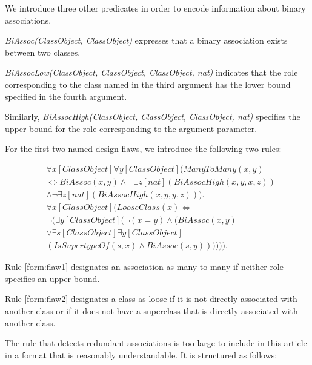 \documentclass[conference]{IEEEtran}
\begin{document}
We introduce three other predicates in order to encode information about binary associations.

\textit{BiAssoc(ClassObject, ClassObject)} expresses that a binary association exists between two classes.

\textit{BiAssocLow(ClassObject, ClassObject, ClassObject, nat)} indicates that the role corresponding to the class named in the third argument has the lower bound specified in the fourth argument.

Similarly, \textit{BiAssocHigh(ClassObject, ClassObject, ClassObject, nat)} specifies the upper bound for the role corresponding to the argument parameter.

For the first two named design flaws, we introduce the following two rules:

\begin{align}
	\nonumber &\forall{x}[ClassObject]\forall{y}[ClassObject](ManyToMany(x, y) \\ \nonumber &\Leftrightarrow BiAssoc(x, y) \land \lnot \exists{z}[nat](BiAssocHigh(x, y, x, z)) \\ &\land \lnot \exists{z}[nat](BiAssocHigh(x, y, y, z))).\label{form:flaw1} \\
	\nonumber &\forall{x}[ClassObject](LooseClass(x) \Leftrightarrow \\ \nonumber &\lnot (\exists{y}[ClassObject](\lnot(x = y) \land (BiAssoc(x, y) \\ \nonumber  &\lor \exists{s}[ClassObject]\exists{y}[ClassObject]\\ &(IsSupertypeOf(s, x) \land BiAssoc(s, y)))))).\label{form:flaw2}
\end{align}

Rule \ref{form:flaw1} designates an association as many-to-many if neither role specifies an upper bound.

Rule \ref{form:flaw2} designates a class as loose if it is not directly associated with another class or if it does not have a superclass that is directly associated with another class.

The rule that detects redundant associations is too large to include in this article in a format that is reasonably understandable. It is structured as follows:
\end{document}
